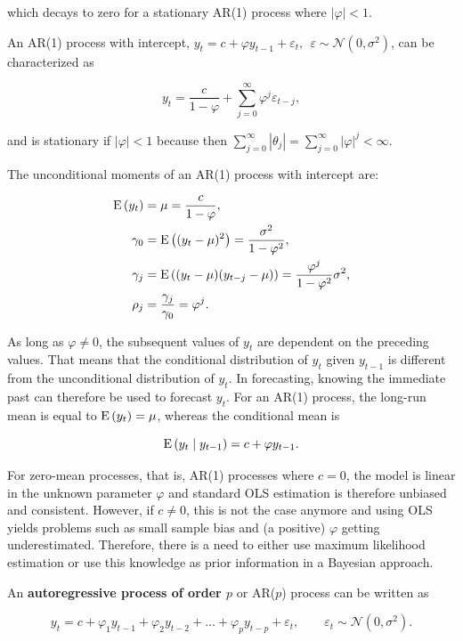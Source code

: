 which decays to zero for a stationary AR(1) process where $|\varphi| < 1$. 

An AR(1) process with intercept, $y_t = c + \varphi y_{t-1} + \varepsilon_t, \:\: \varepsilon\sim\mathcal{N}(0,\sigma^2)$, can be characterized as

\[
	y_t = \frac{c}{1-\varphi} + \sum^\infty_{j=0} \varphi^j\varepsilon_{t-j},
\]

and is stationary if $|\varphi| < 1$ because then $\sum^\infty_{j=0}|\theta_j| = \sum^\infty_{j=0}|\varphi|^j<\infty$.

The unconditional moments of an AR(1) process with intercept are:

\begin{align*}
	\mathrm{E}\left({y_t}\right) &= \mu = \frac{c}{1-\varphi}, \\
	\gamma_0 &= \mathrm{E}\left({(y_t - \mu)^2}\right) = \frac{\sigma^2}{1-\varphi^2}, \\
	\gamma_j &= \mathrm{E}\left({(y_t - \mu)(y_{t-j}-\mu)}\right) = \frac{\varphi^j}{1-\varphi^2}\sigma^2, \\
	\rho_j &= \frac{\gamma_j}{\gamma_0} = \varphi^j.
\end{align*}

As long as $\varphi \neq 0$, the subsequent values of $y_t$ are dependent on the preceding values. That means that the conditional distribution of $y_t$ given $y_{t-1}$ is different from the unconditional distribution of $y_t$. In forecasting, knowing the immediate past can therefore be used to forecast $y_t$. For an AR(1) process, the long-run mean is equal to $\mathrm{E}\left({y_t}\right) = \mu$, whereas the conditional mean is

\[
	\mathrm{E}\left({y_t\mid y_{t-1}}\right) = c + \varphi y_{t-1}.
\]

For zero-mean processes, that is, AR(1) processes where $c = 0$, the model is linear in the unknown parameter $\varphi$ and standard OLS estimation is therefore unbiased and consistent. However, if $c \neq 0$, this is not the case anymore and using OLS yields problems such as small sample bias and (a positive) $\varphi$ getting underestimated. Therefore, there is a need to either use maximum likelihood estimation or use this knowledge as prior information in a Bayesian approach.

An \textbf{autoregressive process of order $p$} or AR($p$) process can be written as

\begin{equation}
	y_t = c + \varphi_1y_{t-1} + \varphi_2y_{t-2} + \dots + \varphi_p y_{t-p} + \varepsilon_t, \qquad \varepsilon_t \sim\mathcal{N}(0,\sigma^2).
\end{equation}

